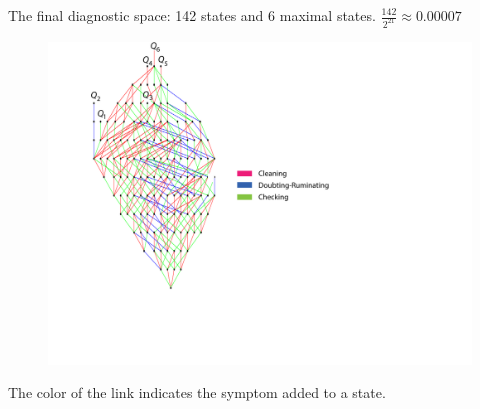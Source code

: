 \documentclass{beamer}
\begin{document}
\begin{frame}{\small The final diagnostic space: 142 states and 6 maximal states. $\frac{142}{2^{21}}\approx 0.00007$}
\vspace{-1.3cm}

\begin{figure}
\vspace{-.58cm}

\hspace{2cm}
\includegraphics[scale=.70]{diagnostic_lattice_5_28_16_modified}
\end{figure}
\vspace{-5cm}

\hspace{6cm} \begin{minipage}{5cm} The color of the link indicates the symptom added to a state.
\end{minipage}
 \vspace{-1cm}

\end{frame}
\end{document}
